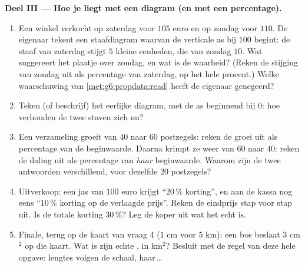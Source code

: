 \begin{problem}
\medskip
\noindent\textbf{Deel III --- Hoe je liegt met een diagram (en met een
percentage).}
\begin{enumerate}[resume]
  \item Een winkel verkocht op zaterdag voor $105$ euro en op zondag voor $110$.
        De eigenaar tekent een staafdiagram waarvan de verticale as bij $100$
        begint: de staaf van zaterdag stijgt $5$ kleine eenheden, die van zondag
        $10$. Wat suggereert het plaatje over zondag, en wat is de waarheid?
        (Reken de stijging van zondag uit als percentage van zaterdag, op het
        hele procent.) Welke waarschuwing van \cref{met:g6:propdata:read} heeft
        de eigenaar genegeerd?
  \item Teken (of beschrijf) het eerlijke diagram, met de as beginnend bij $0$:
        hoe verhouden de twee staven zich nu?
  \item Een verzameling groeit van $40$ naar $60$ postzegels: reken de groei uit
        als percentage van de beginwaarde. Daarna krimpt ze weer van $60$ naar
        $40$: reken de daling uit als percentage van \emph{haar} beginwaarde.
        Waarom zijn de twee antwoorden verschillend, voor dezelfde $20$
        postzegels?
  \item Uitverkoop: een jas van $100$ euro krijgt ``$20\,\%$ korting'', en aan de
        kassa nog eens ``$10\,\%$ korting op de verlaagde prijs''. Reken de
        eindprijs stap voor stap uit. Is de totale korting $30\,\%$? Leg de
        koper uit wat het echt is.
  \item Finale, terug op de kaart van vraag 4 ($1$ cm voor $5$ km): een bos beslaat
        $3$ cm$^2$ op die kaart. Wat is zijn echte , in km$^2$? Besluit
        met de regel van deze hele opgave: lengtes volgen de schaal,
         haar\,\dots
\end{enumerate}
\end{problem}
